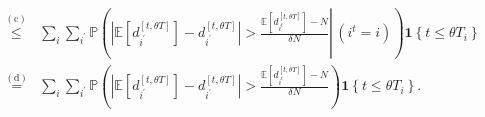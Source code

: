 $$\begin{aligned}
\stackrel{(\mathrm{c})}{\leqslant} & \sum_{i} \sum_{i^{\prime}} \mathbb{P}\left(\left.\left|\mathbb{E}\left[d_{i^{\prime}}^{[t, \theta T]}\right]-d_{i^{\prime}}^{[t, \theta T]}\right| > \frac{\mathbb{E}\left[d_{i^t}^{[t, \theta T]}\right]-N}{\delta N} \right\rvert\,\left(i^t = i\right) \right) \bm{1}\left\{t \leqslant \theta T_{i}\right\} \\
\stackrel{(\mathrm{d})}{=} & \sum_{i} \sum_{i^{\prime}} \mathbb{P}\left(\left|\mathbb{E}\left[d_{i^{\prime}}^{[t, \theta T]}\right]-d_{i^{\prime}}^{[t, \theta T]}\right| > \frac{\mathbb{E}\left[d_{i^t}^{[t, \theta T]}\right]-N}{\delta N} \right) \bm{1}\left\{t \leqslant \theta T_{i}\right\}.
\end{aligned}
$$




